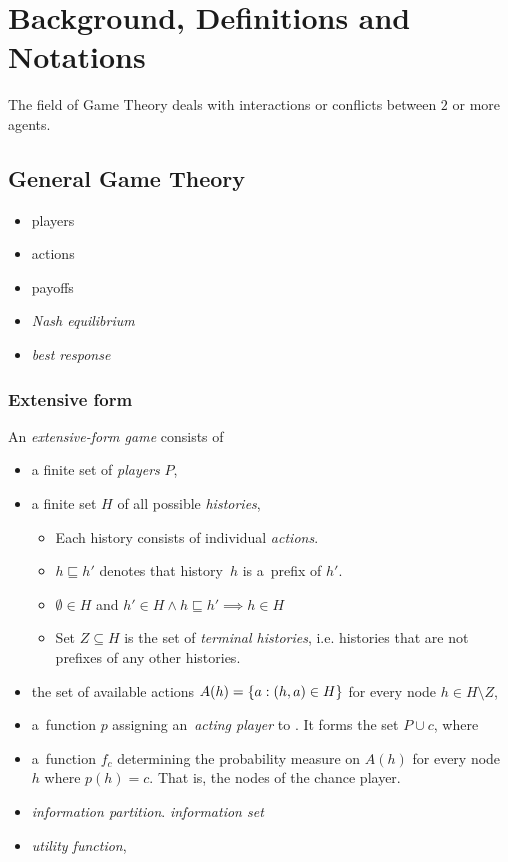 \chapter{Background, Definitions and Notations}

The field of Game Theory deals with interactions or conflicts between $2$ or more agents.
\todo

\section{General Game Theory}

\begin{itemize}
  \item players
  \item actions
  \item payoffs
  \item \emph{Nash equilibrium}
  \item \emph{best response}
\end{itemize}

\subsection{Extensive form}

An \emph{extensive-form game} consists of

\begin{itemize}
  \item a finite set of \emph{players} $P$,
  \item a finite set $H$ of all possible \emph{histories},
    \begin{itemize}
      \item Each history consists of individual \emph{actions}.
      \item $h \sqsubseteq h'$ denotes that history~$h$ is a~prefix of $h'$.
      \item $\emptyset \in H$ and $h' \in H \land h \sqsubseteq h' \implies h \in H$
      \item Set $Z \subseteq H$ is the set of \emph{terminal histories}, i.e. histories that are not prefixes of any other histories.
    \end{itemize}
  \item the set of available actions $A(h) = \left\{ a: (h, a) \in H \right\}$ for every node $h \in H \setminus Z$,
  \item a~function $p$ assigning an~\emph{acting player} to \todo.
    It forms the set $P \cup c$, where \todo
  \item a~function $f_c$ determining the probability measure on $A(h)$ for every node $h$ where $p(h) = c$.
    That is, the nodes of the chance player.
  \item \emph{information partition}. \emph{information set}
  \item \emph{utility function},
\end{itemize}

